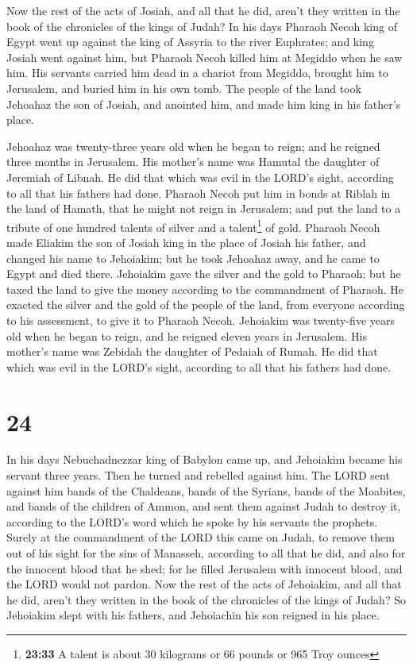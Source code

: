  Now the rest of the acts of Josiah, and all that he did,
aren't they written in the book of the chronicles of the kings of Judah?
 In his days Pharaoh Necoh king of Egypt went up against
the king of Assyria to the river Euphrates; and king Josiah went against
him, but Pharaoh Necoh killed him at Megiddo when he saw him.
 His servants carried him dead in a chariot from Megiddo,
brought him to Jerusalem, and buried him in his own tomb. The people of
the land took Jehoahaz the son of Josiah, and anointed him, and made him
king in his father's place.

 Jehoahaz was twenty-three years old when he began to
reign; and he reigned three months in Jerusalem. His mother's name was
Hamutal the daughter of Jeremiah of Libnah.  He did that
which was evil in the LORD's sight, according to all that his fathers
had done.  Pharaoh Necoh put him in bonds at Riblah in
the land of Hamath, that he might not reign in Jerusalem; and put the
land to a tribute of one hundred talents of silver and a
talent\footnote{\textbf{23:33} A talent is about 30 kilograms or 66
  pounds or 965 Troy ounces} of gold.  Pharaoh Necoh made
Eliakim the son of Josiah king in the place of Josiah his father, and
changed his name to Jehoiakim; but he took Jehoahaz away, and he came to
Egypt and died there.  Jehoiakim gave the silver and the
gold to Pharaoh; but he taxed the land to give the money according to
the commandment of Pharaoh. He exacted the silver and the gold of the
people of the land, from everyone according to his assessment, to give
it to Pharaoh Necoh.  Jehoiakim was twenty-five years old
when he began to reign, and he reigned eleven years in Jerusalem. His
mother's name was Zebidah the daughter of Pedaiah of Rumah.
 He did that which was evil in the LORD's sight,
according to all that his fathers had done.

\hypertarget{section-23}{%
\section{24}\label{section-23}}

 In his days Nebuchadnezzar king of Babylon came up, and
Jehoiakim became his servant three years. Then he turned and rebelled
against him.  The LORD sent against him bands of the
Chaldeans, bands of the Syrians, bands of the Moabites, and bands of the
children of Ammon, and sent them against Judah to destroy it, according
to the LORD's word which he spoke by his servants the prophets.
 Surely at the commandment of the LORD this came on Judah,
to remove them out of his sight for the sins of Manasseh, according to
all that he did,  and also for the innocent blood that he
shed; for he filled Jerusalem with innocent blood, and the LORD would
not pardon.  Now the rest of the acts of Jehoiakim, and
all that he did, aren't they written in the book of the chronicles of
the kings of Judah?  So Jehoiakim slept with his fathers,
and Jehoiachin his son reigned in his place.

